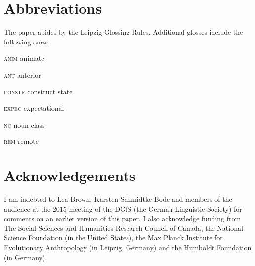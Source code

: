 \documentclass[output=paper]{langsci/langscibook}
\begin{document}
\section{Abbreviations}

The paper abides by the Leipzig Glossing Rules. Additional glosses include the following ones:


\textsc{anim}  animate



\textsc{ant}  anterior



\textsc{constr}  construct state



\textsc{expec}  expectational



\textsc{nc}  noun class



\textsc{rem}  remote


\section{Acknowledgements}

I am indebted to Lea Brown, Karsten Schmidtke-Bode and members of the audience at the 2015 meeting of the DGfS (the German Linguistic Society) for comments on an earlier version of this paper. I also acknowledge funding from The Social Sciences and Humanities Research Council of Canada, the National Science Foundation (in the United States), the Max Planck Institute for Evolutionary Anthropology (in Leipzig, Germany) and the Humboldt Foundation (in Germany).
\end{document}
